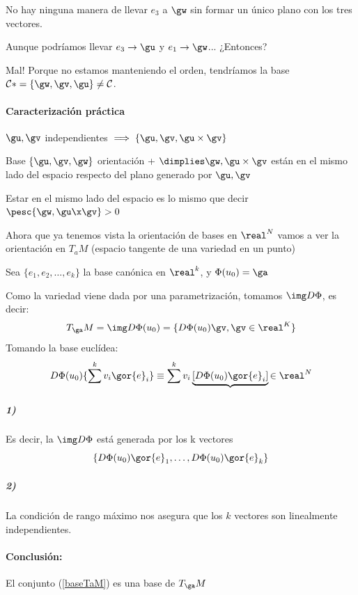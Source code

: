 No hay ninguna manera de llevar $e_3$ a $\gw$ sin formar un único plano con los tres vectores. 

Aunque podríamos llevar $e_3 \to \gu$ y $e_1 \to \gw$... ¿Entonces?

Mal! Porque no estamos manteniendo el orden, tendríamos la base $\mathcal{C}* = \{\gw,\gv,\gu\}\neq\mathcal{C}$.


\paragraph{Caracterización práctica}
\begin{lemma}
$\gu,\gv$ independientes $\implies \{ \gu,\gv,\gu\times\gv \}$
\end{lemma}

\begin{lemma} Base $\{\gu,\gv,\gw\}$ orientación + $\dimplies \gw,\gu\times\gv$ están en el mismo lado del espacio respecto del plano generado por $\gu,\gv$
\end{lemma}
\obs Estar en el mismo lado del espacio es lo mismo que decir $\pesc{\gw,\gu\x\gv} > 0$

Ahora que ya tenemos vista la orientación de bases en $\real^N$ vamos a ver la orientación en $T_a M$ (espacio tangente de una variedad en un punto)


Sea $\{e_1,e_2,\dotsc,e_k\}$ la base canónica en $\real^k$, y $\Phi(u_0)=\ga$

Como la variedad viene dada por una parametrización, tomamos $\img D\Phi$, es decir: \[T_{\ga}M = \img D\Phi(u_0)  = \{D\Phi(u_0)\gv,\gv\in\real^K\}\]
Tomando la base euclídea:
\[D\Phi(u_0) \{\sum^k v_i\gor{e}_i\}\equiv \sum^k v_i\underbrace{[D\Phi(u_0)\gor{e}_i]}{\in\real^N} \]

\subparagraph{1)}Es decir, la $\img D\Phi$ está generada por los k vectores \begin{equation}\label{baseTaM}
\{ D\Phi(u_0)\gor{e}_1,\dotsc ,D\Phi(u_0)\gor{e}_k \}
\end{equation}

\subparagraph{2)}
La condición de rango máximo nos asegura que los $k$ vectores son linealmente independientes.

\paragraph{Conclusión:} El conjunto (\ref{baseTaM}) es una base de $T_{\ga}M$

